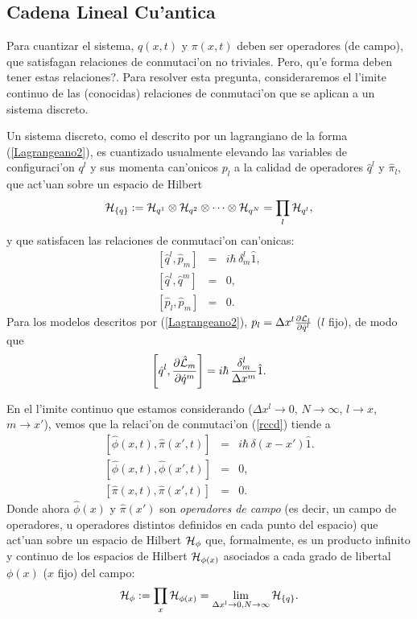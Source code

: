 \subsection{Cadena Lineal Cu'antica}\label{seccon}

Para cuantizar el sistema, $q(x,t) $ y $\pi(x,t) $ deben ser operadores (de
campo), que satisfagan relaciones de conmutaci'on no triviales. Pero,
\textquestiondown qu'e forma deben tener estas relaciones?. Para resolver esta
pregunta, consideraremos el l'imite continuo de las  (conocidas) relaciones de
conmutaci'on que se aplican a un sistema discreto.

Un sistema discreto, como el descrito por un lagrangiano de la forma
(\ref{Lagrangeano2}), es cuantizado usualmente elevando las variables de
configuraci'on $q^l$ y sus momenta can'onicos $p_l$ a la calidad de operadores
$\hat{q}^l$ y $\hat{\pi}_l$, que act'uan sobre un espacio de Hilbert
\begin{equation}
{\cal H}_{\{q\}}:={\cal H}_{q^1}\otimes{\cal H}_{q^2}\otimes \cdots \otimes
{\cal H}_{q^N}=\prod_l {\cal H}_{q^l},
\end{equation}
y que satisfacen las relaciones de conmutaci'on can'onicas:
\begin{eqnarray}
\left[ \hat{q}^l, \hat{p}_m\right] &=&i\hbar\, \delta^l_m \hat{1},\\
\left[ \hat{q}^l, \hat{q}^m\right] &=&0,\\
\left[\hat{p}_l , \hat{p}_m\right] &=&0.
\end{eqnarray}
Para los modelos descritos por  (\ref{Lagrangeano2}), $p_{l}=\Delta
x^{l}\frac{\partial{\cal L}_{l}}{\partial\dot{q}^{l}}$ ($l$ fijo), de modo que
\begin{equation}
\left[ \hat{q}^l,\frac{\partial\hat{\cal L}_{m}}{\partial\dot{q}^{m}}\right]
=i\hbar\, \frac{\delta^l_m}{\Delta x^{m}} \hat{1}.
\label{rccd}
\end{equation}

En el l'imite continuo que estamos considerando ($\Delta x^l\rightarrow 0$,
$N\rightarrow\infty$, $l\rightarrow x$, $m\rightarrow x'$), vemos que la
relaci'on de conmutaci'on (\ref{rccd}) tiende a
\begin{eqnarray}
\left[ \hat{\phi}(x,t),\hat{\pi}(x',t)\right] &=&i\hbar\, \delta (x-x') \hat{1}.
\label{rccc}\\
\left[ \hat{\phi}(x,t),\hat{\phi}(x',t)\right]&=&0,\\
\left[ \hat{\pi}(x,t),\hat{\pi}(x',t)\right]&=&0 \label{rccc3}.
\end{eqnarray}
Donde ahora $\hat{\phi}(x)$ y $\hat{\pi}(x')$ son \textit{operadores de campo}
(es decir, un campo de operadores, u  operadores distintos definidos en cada
punto del espacio) que act'uan sobre un espacio de Hilbert ${\cal H}_\phi$ que,
formalmente, es un producto infinito y continuo de los espacios de Hilbert
${\cal H}_{\phi(x)}$ asociados a cada grado de libertal $\phi(x)$ ($x$ fijo) del
campo:
\begin{equation}
{\cal H}_\phi:=\prod_x {\cal H}_{\phi(x)}=\lim_{\Delta x^l \rightarrow 0, N
\rightarrow\infty} {\cal H}_{\{q\}}.
\end{equation}

